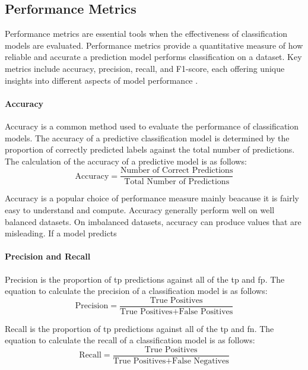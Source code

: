 \documentclass[10pt, conference]{IEEEtran}
\begin{document}
\subsection{Performance Metrics} \label{section: Perf_Metrics_background}

Performance metrics are essential tools when the effectiveness of classification models are evaluated. Performance metrics
provide a quantitative measure of how reliable and accurate a prediction model performs classification on a dataset.
Key metrics include accuracy, precision, recall, and F1-score, each offering unique insights into different aspects
of model performance \cite{Performance_ref}.

\paragraph{Accuracy}
Accuracy is a common method used to evaluate the performance of classification models. The accuracy of
a predictive classification model is determined by the proportion of correctly predicted labels against
the total number of predictions. The calculation of the accuracy of a predictive model is as follows:
\begin{equation}
    \text{Accuracy} = \frac{\text{Number of Correct Predictions}}{\text{Total Number of Predictions}} \label{accuracy}
\end{equation}

Accuracy is a popular choice of performance measure mainly beacause it is fairly easy to understand and compute.
Accuracy generally perform well on well balanced datasets. On imbalanced datasets, accuracy can produce
values that are misleading. If a model predicts 

\paragraph{Precision and Recall}
Precision is the proportion of \acrfull{tp} predictions against all of the \acrshort{tp} and \acrfull{fp}.
The equation to calculate the precision of a classification model is as follows:
\begin{equation}
    \text{Precision} = \frac{\text{True Positives}}{\text{True Positives} + \text{False Positives}} \label{Precision}
\end{equation}

Recall is the proportion of \acrshort{tp} predictions against all of the \acrshort{tp} and \acrfull{fn}.
The equation to calculate the recall of a classification model is as follows:
\begin{equation}
    \text{Recall} = \frac{\text{True Positives}}{\text{True Positives} + \text{False Negatives}} \label{Recall}
\end{equation}
\end{document}
